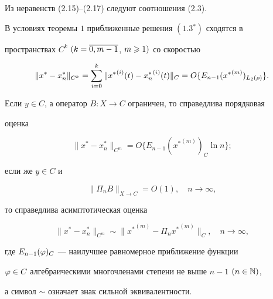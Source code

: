 Из неравенств (2.15)--(2.17) следуют соотношения (2.3).





\begin{thm}


В условиях теоремы $1$ приближенные решения $(1.3{}^*)$ сходятся в 


пространствах $C^k$ $(k=\overline{0,m-1}$, $m\geqslant 1)$ со скоростью


\begin{equation}


\|x^*-x_n^*\|_{C^k} = \suml_{i=0}^k


\|{x^*}^{(i)}(t) - {x_n^*}^{(i)}(t)\|_C =


O\{E_{n-1}({x^*}^{(m)})_{L_2(\rho)}\}.


\end{equation}


Если $y\in C$, а оператор $B:X\to C$ ограничен, то справедлива порядковая 


оценка


\begin{equation}


\|x^* - x^*_n\|_{C^m} = O\{E_{n-1}({x^*}^{(m)})_C \ln n\};


\end{equation}


если же $y\in C$ и


\begin{equation}


\|\Pi_n B\|_{X\to C} = O(1),\quad n\to \infty,


\end{equation}


то справедлива асимптотическая оценка


\begin{equation}


\|x^*-x^*_n\|_{C^m} \sim \|{x^*}^{(m)} - \Pi_n {x^*}^{(m)}\|_C,


\quad n\to \infty,


\end{equation}


где $E_{n-1}(\varphi)_C$ --- наилучшее равномерное приближение функции


$\varphi \in C$ алгебраическими многочленами степени не выше $n-1$ $(n\in \Bbb{N})$,


а символ $\sim$ означает знак сильной эквивалентности.


\end{thm}





